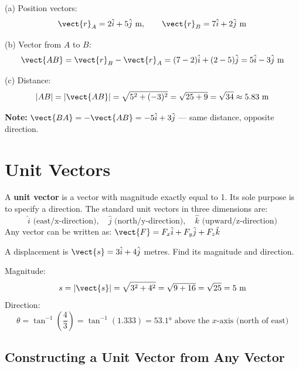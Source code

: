 \begin{solutionbox}
(a) Position vectors:
\[
  \vect{r}_A = 2\hat{i} + 5\hat{j}\ \text{m},\qquad
  \vect{r}_B = 7\hat{i} + 2\hat{j}\ \text{m}
\]

(b) Vector from $A$ to $B$:
\[
  \vect{AB} = \vect{r}_B - \vect{r}_A
  = (7-2)\hat{i} + (2-5)\hat{j}
  = 5\hat{i} - 3\hat{j}\ \text{m}
\]

(c) Distance:
\[
  |AB| = |\vect{AB}| = \sqrt{5^2 + (-3)^2}
  = \sqrt{25 + 9} = \sqrt{34} \approx 5.83\ \text{m}
\]

\textbf{Note:} $\vect{BA} = -\vect{AB} = -5\hat{i} + 3\hat{j}$
--- same distance, opposite direction.
\end{solutionbox}

\section{Unit Vectors}
\label{sec:unit_vectors}

\begin{definitionbox}
A \textbf{unit vector} is a vector with magnitude exactly
equal to 1. Its sole purpose is to specify a direction.
The standard unit vectors in three dimensions are:
\[
  \hat{i} \text{ (east/x-direction)},\quad
  \hat{j} \text{ (north/y-direction)},\quad
  \hat{k} \text{ (upward/z-direction)}
\]
Any vector can be written as:
$\vect{F} = F_x\hat{i} + F_y\hat{j} + F_z\hat{k}$
\end{definitionbox}

\begin{examplebox}[2.9]
A displacement is $\vect{s} = 3\hat{i} + 4\hat{j}$
metres. Find its magnitude and direction.
\end{examplebox}

\begin{solutionbox}
Magnitude:
\[
  s = |\vect{s}| = \sqrt{3^2 + 4^2}
  = \sqrt{9 + 16} = \sqrt{25} = 5\ \text{m}
\]
Direction:
\[
  \theta = \tan^{-1}\!\left(\frac{4}{3}\right)
  = \tan^{-1}(1.333) = 53.1°
  \text{ above the } x\text{-axis (north of east)}
\]
\end{solutionbox}

\subsection*{Constructing a Unit Vector from Any Vector}

